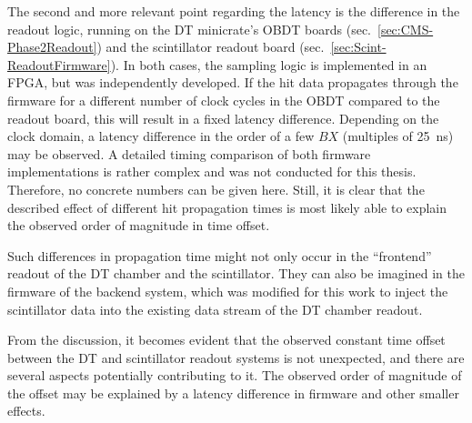 \par The second and more relevant point regarding the latency is the difference in the readout logic, running on the \ac{DT} minicrate’s \ac{OBDT} boards (sec.\ \ref{sec:CMS-Phase2Readout}) and the scintillator readout board (sec.\ \ref{sec:Scint-ReadoutFirmware}). In both cases, the sampling logic is implemented in an \ac{FPGA}, but was independently developed. If the hit data propagates through the firmware for a different number of clock cycles in the \ac{OBDT} compared to the readout board, this will result in a fixed latency difference. Depending on the clock domain, a latency difference in the order of a few $BX$ (multiples of \SI{25}{\nano\second}) may be observed. A detailed timing comparison of both firmware implementations is rather complex and was not conducted for this thesis. Therefore, no concrete numbers can be given here. Still, it is clear that the described effect of different hit propagation times is most likely able to explain the observed order of magnitude in time offset.
\par Such differences in propagation time might not only occur in the \enquote{frontend} readout of the \ac{DT} chamber and the scintillator. They can also be imagined in the firmware of the backend system, which was modified for this work to inject the scintillator data into the existing data stream of the \ac{DT} chamber readout.
\par From the discussion, it becomes evident that the observed constant time offset between the \ac{DT} and scintillator readout systems is not unexpected, and there are several aspects potentially contributing to it. The observed order of magnitude of the offset may be explained by a latency difference in firmware and other smaller effects.
